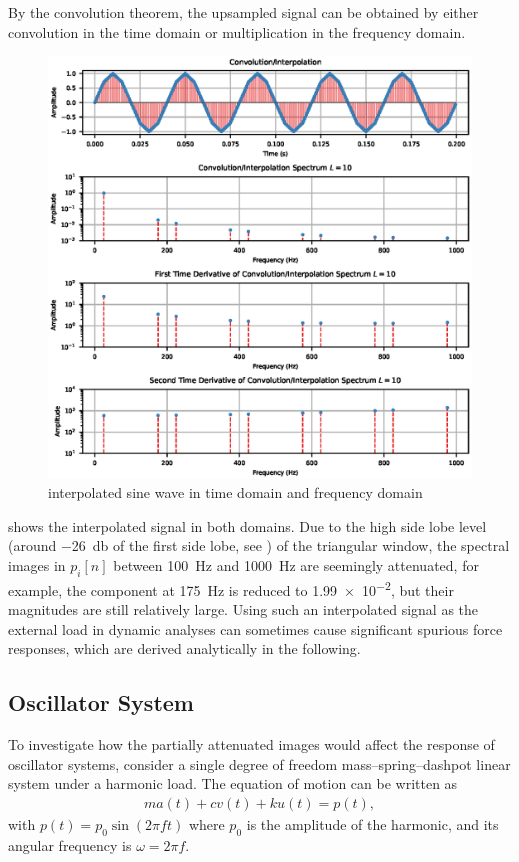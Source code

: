 By the convolution theorem, the upsampled signal can be obtained by either convolution in the time domain or multiplication in the frequency domain.
\begin{figure}[htb!]
\centering
\includegraphics{PIC/Convolution}
\caption{interpolated sine wave in time domain and frequency domain}\label{fig:interpolated}
\end{figure}
 shows the interpolated signal in both domains. Due to the high side lobe level (around \SI{-26}{\decibel} of the first side lobe, see ) of the triangular window, the spectral images in $p_i[n]$ between \SI{100}{\hertz} and \SI{1000}{\hertz} are seemingly attenuated, for example, the component at \SI{175}{\hertz} is reduced to \num{1.99e-2}, but their magnitudes are still relatively large. Using such an interpolated signal as the external load in dynamic analyses can sometimes cause significant spurious force responses, which are derived analytically in the following.
\subsection{Oscillator System}
To investigate how the partially attenuated images would affect the response of oscillator systems, consider a single degree of freedom mass--spring--dashpot linear system under a harmonic load. The equation of motion can be written as
\begin{gather}
ma\left(t\right)+cv\left(t\right)+ku\left(t\right)=p\left(t\right),
\end{gather}
with $p\left(t\right)=p_0\sin\left(2\pi{}ft\right)$ where $p_0$ is the amplitude of the harmonic, and its angular frequency is $\omega=2\pi{}f$.


